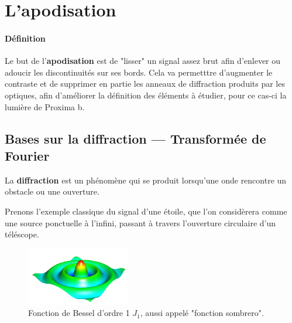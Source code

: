 \section{\centering L'apodisation}

\paragraph{Définition} Le but de l'\textbf{apodisation} est de "lisser" un signal assez brut afin d'enlever ou adoucir les discontinuités sur ses bords. 
Cela va permetttre d'augmenter le contraste et de supprimer en partie les anneaux de diffraction produits par les optiques, afin d'améliorer la définition des éléments à étudier, pour ce cas-ci la lumière de Proxima b.

\subsection{Bases sur la diffraction — Transformée de Fourier}

    


La \textbf{diffraction} est un phénomène qui se produit lorsqu'une onde rencontre un obstacle ou une ouverture. 

Prenons l'exemple classique du signal d'une étoile, que l'on considèrera comme une source ponctuelle à l'infini, passant à travers l'ouverture circulaire d'un téléscope. 

\begin{figure}
    \centering
    \includegraphics[width=0.4\textwidth]{figures/bessel_func.jpg}
    \caption{Fonction de Bessel d'ordre 1 $J_1$, aussi appelé "fonction sombrero".}
    \label{fig:sombrero}
\end{figure}

